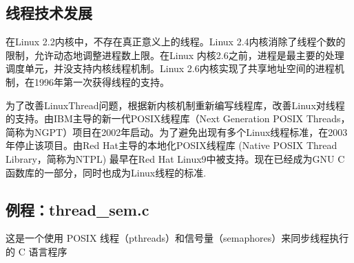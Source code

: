 \documentclass[12pt, a4paper, oneside]{ctexbook}
\numberwithin{figure}{section}
\begin{document}
\subsection{线程技术发展}
在Linux 2.2内核中，不存在真正意义上的线程。Linux 2.4内核消除了线程个数的限制，允许动态地调整进程数上限。在Linux 内核2.6之前，进程是最主要的处理调度单元，并没支持内核线程机制。Linux 2.6内核实现了共享地址空间的进程机制，在1996年第一次获得线程的支持。

为了改善LinuxThread问题，根据新内核机制重新编写线程库，改善Linux对线程的支持。由IBM主导的新一代POSIX线程库（Next Generation POSIX Threads，简称为NGPT）项目在2002年启动。为了避免出现有多个Linux线程标准，在2003年停止该项目。由Red Hat主导的本地化POSIX线程库 (Native POSIX Thread Library，简称为NTPL) 最早在Red Hat Linux9中被支持。现在已经成为GNU C函数库的一部分，同时也成为Linux线程的标准.

\subsection{例程：thread_sem.c}
这是一个使用 POSIX 线程（pthreads）和信号量（semaphores）来同步线程执行的 C 语言程序
\end{document}
